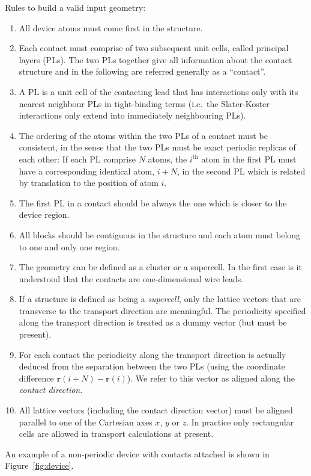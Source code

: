 Rules to build a valid input geometry:
\begin{enumerate}
\item \label{rule1} All device atoms must come first in the structure.
\item \label{rule2} Each contact must comprise of two subsequent unit cells,
  called principal layers (PLs). The two PLs together give all information about
  the contact structure and in the following are referred generally as a
  ``contact''.
\item \label{rule3} A PL is a unit cell of the contacting lead that has
  interactions only with its nearest neighbour PLs in tight-binding terms
  (i.e.\ the Slater-Koster interactions only extend into immediately neighbouring
  PLs).
\item \label{rule4} The ordering of the atoms within the two PLs of a contact
  must be consistent, in the sense that the two PLs must be exact periodic
  replicas of each other: If each PL comprise $N$ atoms, the $i^\mathrm{th}$
  atom in the first PL must have a corresponding identical atom, $i+N$, in the
  second PL which is related by translation to the position of atom $i$.
\item \label{rule5} The first PL in a contact should be always the one which is
  closer to the device region.
\item \label{rule6} All blocks should be contiguous in the structure and each
  atom must belong to one and only one region.
\item \label{rule7} The geometry can be defined as a cluster or a supercell. In
  the first case is it understood that the contacts are one-dimensional wire
  leads.
\item \label{rule8} If a structure is defined as being a {\em supercell}, only
  the lattice vectors that are transverse to the transport direction are
  meaningful. The periodicity specified along the transport direction is treated
  as a dummy vector (but must be present).
\item \label{rule9} For each contact the periodicity along the transport
  direction is actually deduced from the separation between the two PLs (using
  the coordinate difference $\mathbf{r}(i+N)-\mathbf{r}(i)$). We refer to this
  vector as aligned along the {\em contact direction}.
\item \label{rule10} All lattice vectors (including the contact direction
  vector) must be aligned parallel to one of the Cartesian axes $x$, $y$ or
  $z$. In practice only rectangular cells are allowed in transport calculations
  at present.
\end{enumerate}
An example of a non-periodic device with contacts attached is shown in
Figure~\ref{fig:device}.


